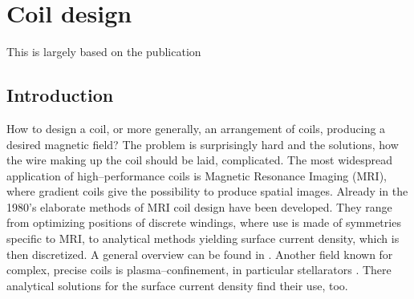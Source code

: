 \chapter{Coil design} %
\label{ch:coil_design}

This is largely based on the publication 

\section{Introduction}
How to design a coil, or more generally, an arrangement of coils, producing a desired magnetic field? The problem is surprisingly hard and the solutions, how the wire making up the coil should be laid, complicated. The most widespread application of high--performance coils is Magnetic Resonance Imaging (MRI), where gradient coils give the possibility to produce spatial images. Already in the 1980's elaborate methods of MRI coil design have been developed. They range from optimizing positions of discrete windings, where use is made of symmetries specific to MRI, to analytical methods yielding surface current density, which is then discretized. A general overview can be found in \cite{Turner1993}. Another field known for complex, precise coils is plasma--confinement, in particular stellarators \cite{Beidler1990}. There analytical solutions for the surface current density find their use, too.



